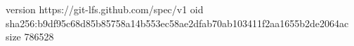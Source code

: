 version https://git-lfs.github.com/spec/v1
oid sha256:b9df95c68d85b85758a14b553ec58ae2dfab70ab103411f2aa1655b2de2064ac
size 786528
